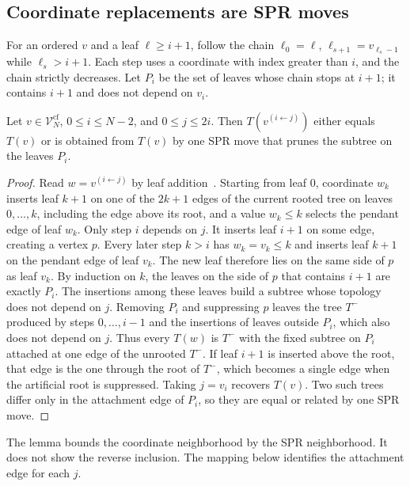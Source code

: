 \subsection{Coordinate replacements are SPR moves}
\label{sec:coord_spr}

For an ordered $v$ and a leaf $\ell\geq i+1$, follow the chain $\ell_0=\ell$, $\ell_{s+1}=v_{\ell_s-1}$ while $\ell_s>i+1$.
Each step uses a coordinate with index greater than $i$, and the chain strictly decreases.
Let $P_i$ be the set of leaves whose chain stops at $i+1$; it contains $i+1$ and does not depend on $v_i$.

\begin{lemma}
\label{lem:coord_spr}
Let $v\in\mathcal V_N^{\mathrm{cf}}$, $0\leq i\leq N-2$, and $0\leq j\leq2i$.
Then $T(v^{(i\leftarrow j)})$ either equals $T(v)$ or is obtained from $T(v)$ by one SPR move that prunes the subtree on the leaves $P_i$.
\end{lemma}
\begin{proof}
Read $w=v^{(i\leftarrow j)}$ by leaf addition~\cite{penn2024phylo2vec}.
Starting from leaf $0$, coordinate $w_k$ inserts leaf $k+1$ on one of the $2k+1$ edges of the current rooted tree on leaves $0,\ldots,k$, including the edge above its root, and a value $w_k\leq k$ selects the pendant edge of leaf $w_k$.
Only step $i$ depends on $j$.
It inserts leaf $i+1$ on some edge, creating a vertex $p$.
Every later step $k>i$ has $w_k=v_k\leq k$ and inserts leaf $k+1$ on the pendant edge of leaf $v_k$.
The new leaf therefore lies on the same side of $p$ as leaf $v_k$.
By induction on $k$, the leaves on the side of $p$ that contains $i+1$ are exactly $P_i$.
The insertions among these leaves build a subtree whose topology does not depend on $j$.
Removing $P_i$ and suppressing $p$ leaves the tree $T^-$ produced by steps $0,\ldots,i-1$ and the insertions of leaves outside $P_i$, which also does not depend on $j$.
Thus every $T(w)$ is $T^-$ with the fixed subtree on $P_i$ attached at one edge of the unrooted $T^-$.
If leaf $i+1$ is inserted above the root, that edge is the one through the root of $T^-$, which becomes a single edge when the artificial root is suppressed.
Taking $j=v_i$ recovers $T(v)$.
Two such trees differ only in the attachment edge of $P_i$, so they are equal or related by one SPR move.
\end{proof}

The lemma bounds the coordinate neighborhood by the SPR neighborhood.
It does not show the reverse inclusion.
The mapping below identifies the attachment edge for each $j$.

